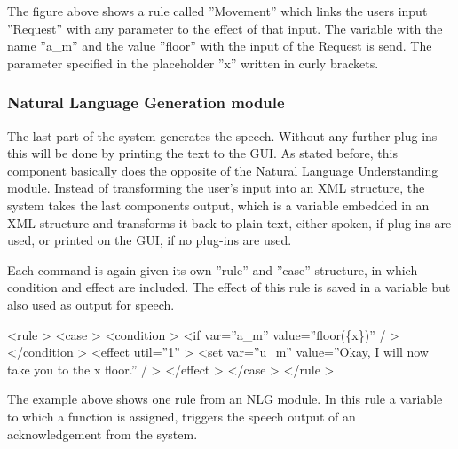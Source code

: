 \documentclass[a4paper, 12pt]{article}
\begin{document}
The figure above shows  a rule called ”Movement” which links the users input ”Request” with any parameter to the effect of that input.
The variable with the name ”a\_m” and the value ”floor” with the input of the Request is send.
The parameter specified in the placeholder ”x” written in curly brackets.
\subsubsection{Natural Language Generation module}
The last part of the system generates the speech. 
Without any further plug-ins this will be done by printing the text to the GUI.
As stated before, this component basically does the opposite of the Natural Language Understanding module. 
Instead of transforming the user's input into an XML structure, the system takes the last components output, which is a variable embedded in an XML structure and transforms it back to plain text, either spoken, if plug-ins are used, or printed on the GUI, if no plug-ins are used. \newline

Each command is again given its own ”rule” and ”case” structure, in which condition and effect are included. 
The effect of this rule is saved in a variable but also used as output for speech. \newline

\textless rule \textgreater \newline
\indent \indent \textless case \textgreater \newline
\indent \indent \indent \textless condition \textgreater \newline 
\indent \indent \indent \indent \textless if var=”a\_m” value=”floor(\{x\})” / \textgreater \newline
\indent \indent \indent \textless /condition \textgreater \newline
\indent \indent \indent \textless effect util=”1” \textgreater \newline 
\indent \indent \indent \indent \textless set var=”u\_m” value=”Okay, I will now take you to the {x} floor.” / \textgreater \newline
\indent \indent \indent \textless /effect \textgreater \newline
\indent \indent\textless /case \textgreater \newline
\indent \textless /rule \textgreater \newline

The example above shows one rule from an NLG module. 
In this rule a variable to which a function  is assigned, triggers the speech output of an acknowledgement from the system.
        
\end{document}
